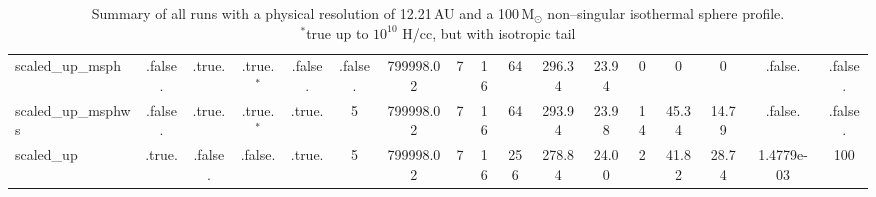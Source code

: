 \begin{table}
\begin{adjustbox}{width=1.8\textheight}
\begin{tabular}{lcccccccccccccccc}
scaled\_up\_msph & .false. & .true. & .true.$^{\ast}$ & .false. & .false. & 799998.02 & 7 & 16 & 64 & 296.34 & 23.94 & 0 & 0 & 0 & .false. & .false. \\
scaled\_up\_msphws & .false. & .true. & .true.$^{\ast}$ & .true. & 5 & 799998.02 & 7 & 16 & 64 & 293.94 & 23.98 & 14 & 45.34 & 14.79 & .false. & .false. \\
scaled\_up & .true. & .false. & .false. & .true. & 5 & 799998.02 & 7 & 16 & 256 & 278.84 & 24.00 & 2 & 41.82 & 28.74 & 1.4779e-03 & 100 \\
\bottomrule
\end{tabular}
\end{adjustbox}
\caption[High--resolution runs]{Summary of all runs with a physical resolution of 12.21\,AU and a 100\,M$_{\odot}$ non--singular isothermal sphere profile.\\
				        $^{\ast}$true up to $10^{10}$ H/cc, but with isotropic tail}
\label{tab:scaled}
\end{table}
